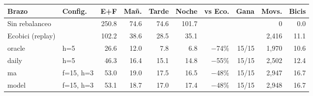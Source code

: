 \begin{tabular}{llrrrrrrrr}
\toprule
Brazo & Config. & E+F & Mañ. & Tarde & Noche & vs Eco. & Gana & Movs. & Bicis \\
\midrule
Sin rebalanceo &  & 250.8 & 74.6 & 74.6 & 101.7 &  &  & 0 & 0.0 \\
Ecobici (replay) &  & 102.2 & 38.6 & 28.5 & 35.1 &  &  & 2,416 & 11.1 \\
oracle & h=5 & 26.6 & 12.0 & 7.8 & 6.8 & $-$74\% & 15/15 & 1,970 & 10.6 \\
daily & h=5 & 46.3 & 16.4 & 15.1 & 14.8 & $-$55\% & 15/15 & 2,502 & 12.4 \\
ma & f=15, h=3 & 53.0 & 19.0 & 17.5 & 16.5 & $-$48\% & 15/15 & 2,947 & 16.7 \\
model & f=15, h=3 & 53.1 & 18.7 & 17.0 & 17.4 & $-$48\% & 15/15 & 2,948 & 16.7 \\
\bottomrule
\end{tabular}
